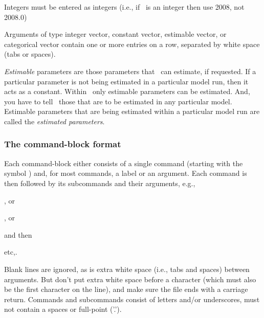 Integers must be entered as integers (i.e., if \ is an integer then use 2008, not 2008.0)

Arguments of type integer vector, constant vector, estimable vector, or categorical vector contain one or more entries on a row, separated by white space (tabs or spaces). 

\emph{Estimable} parameters are those parameters that \SPM\ can estimate, if requested. If a particular parameter is not being estimated in a particular model run, then it acts as a constant.  Within \SPM\, only estimable parameters can be estimated. And, you have to tell \SPM\ those that are to be estimated in any particular model. Estimable parameters that are being estimated within a particular model run are called the \emph{estimated parameters}.

\subsubsection{The command-block format}

Each command-block either consists of a single command (starting with the symbol \@) and, for most commands, a label or an argument. Each command is then followed by its subcommands and their arguments, e.g., 

\begin{description}
\item {}, or 
\item {} , or
\item {} 
\end{description}

and then
\begin{description}
\item {} 
\item {} 
\item etc,.
\end{description}

Blank lines are ignored, as is extra white space (i.e., tabs and spaces) between arguments. But don't put extra white space before a \command{} character (which must also be the first character on the line), and make sure the file ends with a carriage return. Commands and subcommands consist of letters and/or underscores, must not contain a spaces or full-point ('.').


